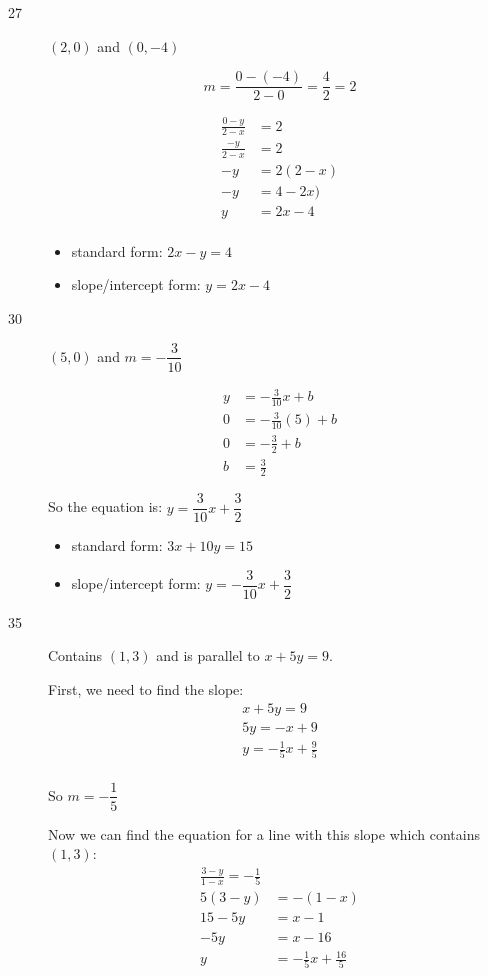 \documentclass[fleqn,addpoints]{exam}
\begin{document}
\begin{description}
\item[27]

$(2, 0)$ and $(0, -4)$

\[
  m = \frac{0 - (-4)}{2-0} = \frac{4}{2} = 2
\]

\begin{align*}
  \frac{0-y}{2-x} &= 2 \\
  \frac{-y}{2-x} &= 2 \\
  -y &= 2(2-x) \\
  -y &= 4-2x) \\
  y &= 2x-4 \\
\end{align*}

\begin{itemize}
  \item standard form: $2x-y=4$
  \item slope/intercept form: $y = 2x-4 $
\end{itemize}

\item[30]

$(5, 0)$ and $m = -\dfrac{3}{10}$

\begin{align*}
  y &= -\frac{3}{10} x + b \\
  0 &= -\frac{3}{10} (5) + b \\
  0 &= -\frac{3}{2} + b \\
  b &= \frac{3}{2}
\end{align*}

So the equation is: $y = \dfrac{3}{10} x + \dfrac{3}{2}$

\begin{itemize}
  \item standard form: $3x+10y=15$
  \item slope/intercept form: $y = -\dfrac{3}{10} x + \dfrac{3}{2}$
\end{itemize}

\item[35]

Contains $(1, 3)$ and is parallel to $x+5y=9$.

First, we need to find the slope:
\begin{align*}
  x+5y=9 \\
  5y=-x + 9 \\
  y= - \frac{1}{5} x + \frac{9}{5} \\
\end{align*}

So $m = - \dfrac{1}{5}$

Now we can find the equation for a line with this slope which contains $(1, 3)$:
\begin{align*}
  \frac{3-y}{1-x} = - \frac{1}{5} \\
  5(3-y) &= -(1-x) \\
  15-5y &= x-1 \\
  -5y &= x-16 \\
  y &= -\frac{1}{5} x + \frac{16}{5} \\
\end{align*}


\end{description}
\end{document}
